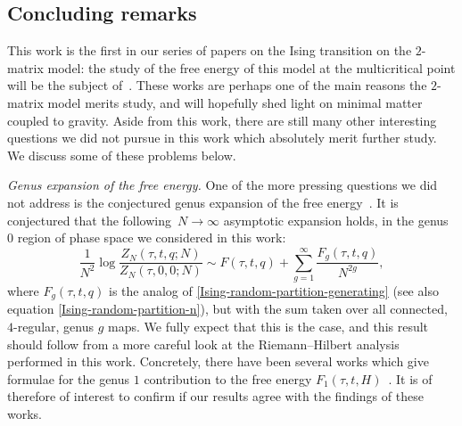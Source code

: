 \documentclass[pdftex]{sigma}
\numberwithin{equation}{section}
\begin{document}
\subsection{Concluding remarks}
This work is the first in our series of papers on the Ising transition on the $2$-matrix model: the study of the free energy of this
model at the multicritical point will be the subject of~\cite{DHL3, DHL2}. These works are perhaps one of the main reasons the $2$-matrix
model merits study, and will hopefully shed light on minimal matter coupled to gravity. Aside from this work, there are still many other
interesting questions we did not pursue in this work which absolutely merit further study. We discuss some of these problems below.



\textit{Genus expansion of the free energy.} One of the more pressing questions we did not
address is the conjectured genus expansion of the free energy~\cite{PGZ, Eynard}. It is conjectured that the following~${N\to \infty}$ asymptotic expansion holds, in the genus $0$ region of phase space we considered in this work:
 \begin{equation*}
 \frac{1}{N^2} \log \frac{Z_N(\tau,t,q;N)}{Z_N(\tau,0,0;N)} \sim F(\tau,t,q) + \sum_{g=1}^{\infty} \frac{F_g(\tau,t,q)}{N^{2g}},
 \end{equation*}
where $F_g(\tau,t,q)$ is the analog of \eqref{Ising-random-partition-generating} (see also equation \eqref{Ising-random-partition-n}), but with the sum taken over all connected, $4$-regular, genus $g$ maps. We fully expect that this is the case, and this result should follow from a more careful look at the Riemann--Hilbert analysis performed in this work. Concretely, there have been several works which
give formulae for the genus $1$ contribution to the free energy $F_1(\tau,t,H)$~\cite{AAD,Eynard}. It is of therefore of interest to confirm if our results agree with the findings of these works.
\end{document}
